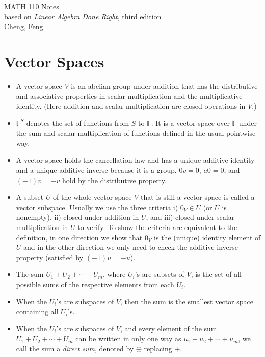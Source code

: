 \documentclass{article}
\newcommand{\F}{\mathbb{F}}
\begin{document}
\begin{center}
    {\Large MATH 110 Notes}
    \\based on \textit{Linear Algebra Done Right}, third edition
    \vspace{0.5em}
    \\ Cheng, Feng
    \vspace{-0.5em}
\end{center}

\section{Vector Spaces}
\begin{itemize}
    \item A vector space $V$ is an abelian group under addition that has the distributive and associative properties in scalar multiplication and the multiplicative identity. (Here addition and scalar multiplication are closed operations in $V$.)
    \item $\F^S$ denotes the set of functions from $S$ to $\F$. It is a vector space over $\F$ under the sum and scalar multiplication of functions defined in the usual pointwise way.
    \item A vector space holds the cancellation law and has a unique additive identity and a unique additive inverse because it is a group. $0v = 0$, $a0 = 0$, and $(-1)v = -v$ hold by the distributive property.
    \item A subset $U$ of the whole vector space $V$ that is still a vector space is called a vector subspace. Usually we use the three criteria i) $0_V \in U$ (or $U$ is nonempty), ii) closed under addition in $U$, and iii) closed under scalar multiplication in $U$ to verify. To show the criteria are equivalent to the definition, in one direction we show that $0_V$ is the (unique) identity element of $U$ and in the other direction we only need to check the additive inverse property (satisfied by $(-1)u = -u$).
    \item The sum $U_1 + U_2 +\cdots+ U_m$, where $U_i$'s are subsets of $V$, is the set of all possible sums of the respective elements from each $U_i$.
    \item When the $U_i$'s are subspaces of $V$, then the sum is the smallest vector space containing all $U_i$'s.
    \item When the $U_i$'s are subspaces of $V$, and every element of the sum $U_1 + U_2 +\cdots+ U_m$ can be written in only one way as $u_1+u_2+\cdots+u_m$, we call the sum a \textit{direct sum}, denoted by $\oplus$ replacing $+$.

\end{itemize}
\end{document}
